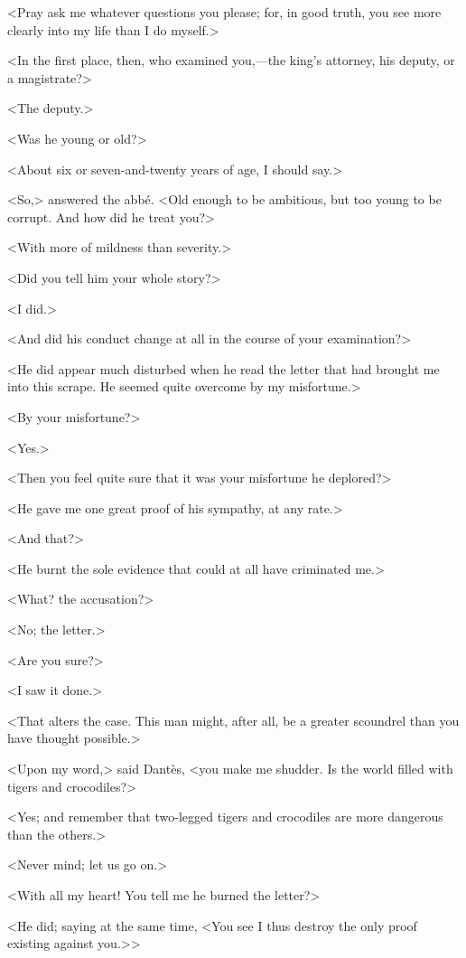  <Pray ask me whatever questions you please; for, in good truth, you see more clearly into my life than I do myself.> 

 <In the first place, then, who examined you,—the king's attorney, his deputy, or a magistrate?> 

 <The deputy.> 

 <Was he young or old?> 

 <About six or seven-and-twenty years of age, I should say.> 

 <So,> answered the abbé. <Old enough to be ambitious, but too young to be corrupt. And how did he treat you?> 

 <With more of mildness than severity.> 

 <Did you tell him your whole story?> 

 <I did.> 

 <And did his conduct change at all in the course of your examination?> 

 <He did appear much disturbed when he read the letter that had brought me into this scrape. He seemed quite overcome by my misfortune.> 

 <By your misfortune?> 

 <Yes.> 

 <Then you feel quite sure that it was your misfortune he deplored?> 

 <He gave me one great proof of his sympathy, at any rate.> 

 <And that?> 

 <He burnt the sole evidence that could at all have criminated me.> 

 <What? the accusation?> 

 <No; the letter.> 

 <Are you sure?> 

 <I saw it done.> 

 <That alters the case. This man might, after all, be a greater scoundrel than you have thought possible.> 

 <Upon my word,> said Dantès, <you make me shudder. Is the world filled with tigers and crocodiles?> 

 <Yes; and remember that two-legged tigers and crocodiles are more dangerous than the others.> 

 <Never mind; let us go on.> 

 <With all my heart! You tell me he burned the letter?> 

 <He did; saying at the same time, <You see I thus destroy the only proof existing against you.>> 


